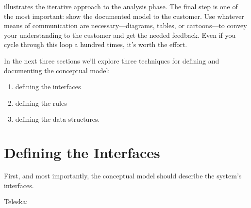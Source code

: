  illustrates the iterative approach to the analysis phase.
The final step is one of the most important: show the documented model
to the customer. Use whatever means of communication are
necessary---diagrams, tables, or cartoons---to convey your understanding to
the customer and get the needed feedback. Even if you cycle through this
loop a hundred times, it's worth the effort.

In the next three sections we'll explore three techniques for defining
and documenting the conceptual model:

\begin{enumerate}
\item defining the interfaces
\item defining the rules
\item defining the data structures.
\end{enumerate}

\section{Defining the Interfaces}

\begin{tip}
First, and most importantly, the conceptual model should describe the
system's interfaces.
\end{tip}

\blackline{2ex}
\noindent Teleska:

